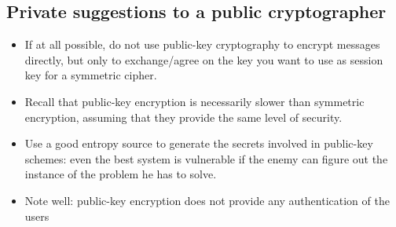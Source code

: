 \documentclass[a4paper, 10pt, titlepage]{article}
\begin{document}
\subsection*{Private suggestions to a public cryptographer}
\begin{itemize}
\item If at all possible, do not use public-key cryptography to encrypt messages directly, but only to exchange/agree on the key you want to use as session key for a symmetric cipher.
\item Recall that public-key encryption is necessarily slower than symmetric encryption, assuming that they provide the same level of security.
\item Use a good entropy source to generate the secrets involved in public-key schemes: even the best system is vulnerable if the enemy can figure out the instance of the problem he has to solve.
\item Note well: public-key encryption does not provide any authentication of the users
\end{itemize}
\end{document}
